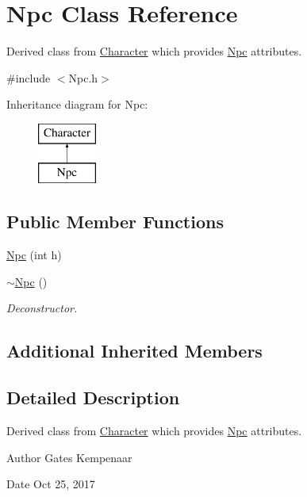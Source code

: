 \hypertarget{classNpc}{\section{Npc Class Reference}
\label{classNpc}
}


Derived class from \hyperlink{classCharacter}{Character} which provides \hyperlink{classNpc}{Npc} attributes.  




{\ttfamily \#include $<$Npc.\-h$>$}

Inheritance diagram for Npc\-:\begin{figure}[H]
\begin{center}
\leavevmode
\includegraphics[height=2.000000cm]{classNpc}
\end{center}
\end{figure}
\subsection*{Public Member Functions}
\begin{DoxyCompactItemize}
\item 
\hyperlink{classNpc_a692a6b5565b561bf0bbfe664bd37fdb7}{Npc} (int h)
\item 
\hyperlink{classNpc_a2249c5155af3d692e51ff610064e81fe}{$\sim$\-Npc} ()
\begin{DoxyCompactList}\small\item\em Deconstructor. \end{DoxyCompactList}\end{DoxyCompactItemize}
\subsection*{Additional Inherited Members}


\subsection{Detailed Description}
Derived class from \hyperlink{classCharacter}{Character} which provides \hyperlink{classNpc}{Npc} attributes. 

\begin{DoxyAuthor}{Author}
Gates Kempenaar 
\end{DoxyAuthor}
\begin{DoxyDate}{Date}
Oct 25, 2017 
\end{DoxyDate}


